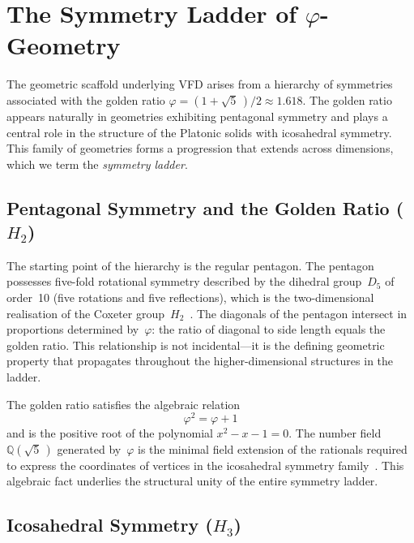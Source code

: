 \documentclass[12pt,a4paper]{article}
\newcommand{\Hthree}{H_3}
\newcommand{\Htwo}{H_2}
\newcommand{\vphi}{\varphi}
\newcommand{\Q}{\mathbb{Q}}
\begin{document}
\section{The Symmetry Ladder of \texorpdfstring{$\vphi$}{φ}-Geometry}
\label{sec:ladder}

The geometric scaffold underlying VFD arises from a hierarchy of symmetries
associated with the golden ratio
$\vphi = (1+\sqrt{5}\,)/2 \approx 1.618$.
The golden ratio appears naturally in geometries exhibiting pentagonal symmetry
and plays a central role in the structure of the Platonic solids with
icosahedral symmetry.  This family of geometries forms a progression that
extends across dimensions, which we term the \emph{symmetry ladder}.

\subsection{Pentagonal Symmetry and the Golden Ratio \texorpdfstring{($\Htwo$)}{(H2)}}

The starting point of the hierarchy is the regular pentagon.  The pentagon
possesses five-fold rotational symmetry described by the dihedral group~$D_5$
of order~10 (five rotations and five reflections), which is the
two-dimensional realisation of the Coxeter
group~$\Htwo$~\cite{humphreys1990}.  The diagonals of the pentagon intersect
in proportions determined by~$\vphi$: the ratio of diagonal to side length
equals the golden ratio.  This relationship is not incidental---it is the
defining geometric property that propagates throughout the higher-dimensional
structures in the ladder.

The golden ratio satisfies the algebraic relation
\begin{equation}\label{eq:phi}
  \vphi^2 = \vphi + 1
\end{equation}
and is the positive root of the polynomial $x^2 - x - 1 = 0$.  The number
field $\Q(\sqrt{5}\,)$ generated by~$\vphi$ is the minimal field extension of
the rationals required to express the coordinates of vertices in the
icosahedral symmetry family~\cite{conway1999}.  This algebraic fact underlies
the structural unity of the entire symmetry ladder.

\subsection{Icosahedral Symmetry \texorpdfstring{($\Hthree$)}{(H3)}}
\end{document}
